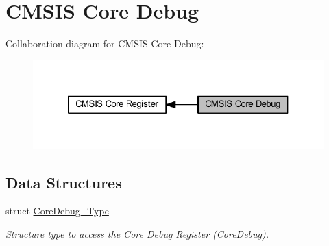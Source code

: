 \hypertarget{group___c_m_s_i_s___core_debug}{}\section{C\+M\+S\+IS Core Debug}
\label{group___c_m_s_i_s___core_debug}
Collaboration diagram for C\+M\+S\+IS Core Debug\+:\nopagebreak
\begin{figure}[H]
\begin{center}
\leavevmode
\includegraphics[width=327pt]{group___c_m_s_i_s___core_debug}
\end{center}
\end{figure}
\subsection*{Data Structures}
\begin{DoxyCompactItemize}
\item 
struct \hyperlink{struct_core_debug___type}{Core\+Debug\+\_\+\+Type}
\begin{DoxyCompactList}\small\item\em Structure type to access the Core Debug Register (Core\+Debug). \end{DoxyCompactList}\end{DoxyCompactItemize}
